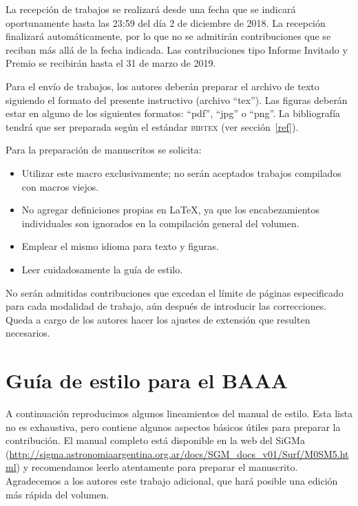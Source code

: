 \documentclass[baaa]{baaa}
\begin{document}
La recepción de trabajos se realizará desde una fecha que se indicará oportunamente hasta las
23:59 del día 2 de diciembre de 2018. La recepción finalizará automáticamente,
por lo que no se admitirán contribuciones que se reciban más allá de la fecha indicada.
Las contribuciones tipo Informe Invitado y Premio %
se recibirán hasta el 31 de marzo de 2019.

Para el envío de trabajos, los autores deberán preparar el archivo de texto siguiendo
el formato del presente instructivo (archivo ``tex''). 
Las figuras deberán estar en alguno de los siguientes formatos: ``pdf'', ``jpg'' o ``png''. 
La bibliografía tendrá que ser preparada según el estándar \textsc{bibtex}  (ver sección~\ref{ref}).

Para la preparación de manuscritos se solicita: 

\begin{itemize}
   \item Utilizar este macro exclusivamente; no serán aceptados trabajos compilados con macros viejos.
   \item No agregar definiciones propias en \LaTeX{}, ya que los encabezamientos
         individuales son ignorados en la compilación general del volumen.
   \item Emplear el mismo idioma para texto y figuras.
  \item Leer cuidadosamente la guía de estilo. 
\end{itemize}

No serán admitidas contribuciones que excedan el límite de páginas especificado para
cada modalidad de trabajo, aún después de introducir las correcciones. Queda
a cargo de los autores hacer los ajustes de extensión que resulten necesarios.


\section{Guía de estilo para el BAAA}

A continuación reproducimos algunos lineamientos del manual de estilo.  
Esta lista no es exhaustiva, pero contiene algunos aspectos básicos útiles para preparar la contribución.
El manual completo está disponible en la web del SiGMa
(\url{http://sigma.astronomiaargentina.org.ar/docs/SGM_docs_v01/Surf/M0SM5.html}) y
recomendamos leerlo atentamente para preparar el manuscrito. 
Agradecemos a los autores este trabajo adicional, que hará posible una edición más rápida del volumen.
\end{document}
